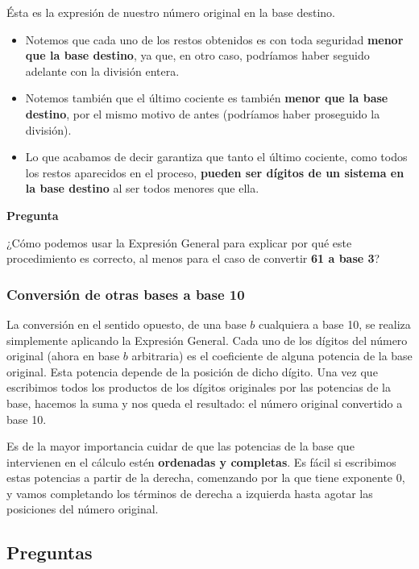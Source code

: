 \documentclass[spanish,A4,]{article}
\begin{document}
Ésta es la expresión de nuestro número original en la base destino.

\begin{itemize}
\itemsep1pt\parskip0pt
\item
  Notemos que cada uno de los restos obtenidos es con toda seguridad
  \textbf{menor que la base destino}, ya que, en otro caso, podríamos
  haber seguido adelante con la división entera.
\item
  Notemos también que el último cociente es también \textbf{menor que la
  base destino}, por el mismo motivo de antes (podríamos haber
  proseguido la división).
\item
  Lo que acabamos de decir garantiza que tanto el último cociente, como
  todos los restos aparecidos en el proceso, \textbf{pueden ser dígitos
  de un sistema en la base destino} al ser todos menores que ella.
\end{itemize}

\textbf{Pregunta}

¿Cómo podemos usar la Expresión General para explicar por qué este
procedimiento es correcto, al menos para el caso de convertir \textbf{61
a base 3}?

\subsubsection{Conversión de otras bases a base
10}\label{conversiuxf3n-de-otras-bases-a-base-10}

La conversión en el sentido opuesto, de una base $b$ cualquiera a base
10, se realiza simplemente aplicando la Expresión General. Cada uno de
los dígitos del número original (ahora en base $b$ arbitraria) es el
coeficiente de alguna potencia de la base original. Esta potencia
depende de la posición de dicho dígito. Una vez que escribimos todos los
productos de los dígitos originales por las potencias de la base,
hacemos la suma y nos queda el resultado: el número original convertido
a base 10.

Es de la mayor importancia cuidar de que las potencias de la base que
intervienen en el cálculo estén \textbf{ordenadas y completas}. Es fácil
si escribimos estas potencias a partir de la derecha, comenzando por la
que tiene exponente 0, y vamos completando los términos de derecha a
izquierda hasta agotar las posiciones del número original.

\subsection{Preguntas}\label{preguntas-1}
\end{document}

